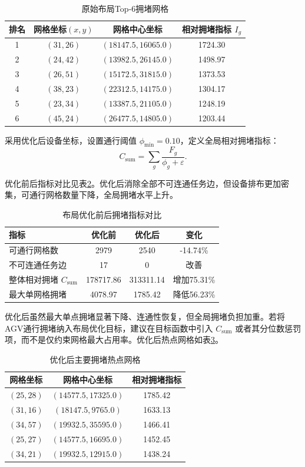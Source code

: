 \documentclass[12pt,a4paper]{article}
\begin{document}
	\begin{table}[htbp]
		\centering
		\caption{原始布局Top‑6拥堵网格}
		\label{tab:congest_origin}
		\begin{tabular}{cccc}
			\toprule
			排名 & 网格坐标$(x,y)$ & 网格中心坐标 & 相对拥堵指标 $I_g$ \\
			\midrule
			1 & $(31,26)$ & $(18147.5,16065.0)$ & 1724.30 \\
			2 & $(24,42)$ & $(13982.5,26145.0)$ & 1498.97 \\
			3 & $(26,51)$ & $(15172.5,31815.0)$ & 1373.53 \\
			4 & $(38,23)$ & $(22312.5,14175.0)$ & 1304.17 \\
			5 & $(23,34)$ & $(13387.5,21105.0)$ & 1248.19 \\
			6 & $(45,24)$ & $(26477.5,14805.0)$ & 1203.44 \\
			\bottomrule
		\end{tabular}
	\end{table}
	
	采用优化后设备坐标，设置通行阈值 $\phi_{\min}=0.10$，定义全局相对拥堵指标：
	\[
	C_{\text{sum}}=\sum_g \frac{F_g}{\phi_g+\varepsilon}.
	\]
	
	优化前后指标对比见表\ref{tab:congest_compare}。优化后消除全部不可连通任务边，但设备排布更加密集，可通行网格数量下降，全局拥堵水平上升。
	\begin{table}[htbp]
		\centering
		\caption{布局优化前后拥堵指标对比}
		\label{tab:congest_compare}
		\begin{tabular}{lccc}
			\toprule
			指标 & 优化前 & 优化后 & 变化 \\
			\midrule
			可通行网格数 & 2979 & 2540 & -14.74\% \\
			不可连通任务边 & 17 & 0 & 改善 \\
			整体相对拥堵 $C_{\text{sum}}$ & 178717.86 & 313311.14 & 增加75.31\% \\
			最大单网格拥堵 & 4078.97 & 1785.42 & 降低56.23\% \\
			\bottomrule
		\end{tabular}
	\end{table}
	
	优化后虽然最大单点拥堵显著下降、连通性恢复，但全局拥堵负担加重。若将AGV通行拥堵纳入布局优化目标，建议在目标函数中引入 $C_{\text{sum}}$ 或者其分位数惩罚项，而不是仅约束网格最大占用率。优化后热点网格如表\ref{tab:congest_opt}。
	
	\begin{table}[htbp]
		\centering
		\caption{优化后主要拥堵热点网格}
		\label{tab:congest_opt}
		\begin{tabular}{ccc}
			\toprule
			网格坐标 & 网格中心坐标 & 相对拥堵指标 \\
			\midrule
			$(25,28)$ & $(14577.5,17325.0)$ & 1785.42 \\
			$(31,16)$ & $(18147.5,9765.0)$ & 1633.13 \\
			$(34,57)$ & $(19932.5,35595.0)$ & 1466.41 \\
			$(25,27)$ & $(14577.5,16695.0)$ & 1452.45 \\
			$(34,21)$ & $(19932.5,12915.0)$ & 1438.24 \\
			\bottomrule
		\end{tabular}
	\end{table}
	
\end{document}
